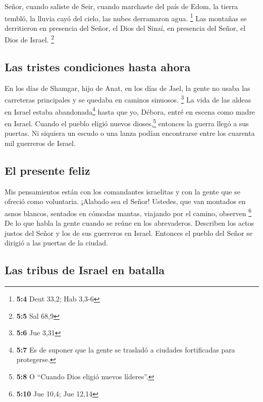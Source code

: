  Señor, cuando saliste de Seir, cuando marchaste del país
de Edom, la tierra tembló, la lluvia cayó del cielo, las nubes
derramaron agua. \footnote{\textbf{5:4} Deut 33,2; Hab 3,3-6}
 Las montañas se derritieron en presencia del Señor, el
Dios del Sinaí, en presencia del Señor, el Dios de Israel. \footnote{\textbf{5:5}
  Sal 68,9}

\hypertarget{las-tristes-condiciones-hasta-ahora}{%
\subsection{Las tristes condiciones hasta
ahora}\label{las-tristes-condiciones-hasta-ahora}}

 En los días de Shamgar, hijo de Anat, en los días de
Jael, la gente no usaba las carreteras principales y se quedaba en
caminos sinuosos. \footnote{\textbf{5:6} Jue 3,31}  La
vida de las aldeas en Israel estaba abandonada\footnote{\textbf{5:7} Es
  de suponer que la gente se trasladó a ciudades fortificadas para
  protegerse.} hasta que yo, Débora, entré en escena como madre en
Israel.  Cuando el pueblo eligió nuevos dioses,\footnote{\textbf{5:8}
  O ``Cuando Dios eligió nuevos líderes''.} entonces la guerra llegó a
sus puertas. Ni siquiera un escudo o una lanza podían encontrarse entre
los cuarenta mil guerreros de Israel.

\hypertarget{el-presente-feliz}{%
\subsection{El presente feliz}\label{el-presente-feliz}}

 Mis pensamientos están con los comandantes israelitas y
con la gente que se ofreció como voluntaria. ¡Alabado sea el Señor!
 Ustedes, que van montados en asnos blancos, sentados en
cómodas mantas, viajando por el camino, observen \footnote{\textbf{5:10}
  Jue 10,4; Jue 12,14}  De lo que habla la gente cuando
se reúne en los abrevaderos. Describen los actos justos del Señor y los
de sus guerreros en Israel. Entonces el pueblo del Señor se dirigió a
las puertas de la ciudad.

\hypertarget{las-tribus-de-israel-en-batalla}{%
\subsection{Las tribus de Israel en
batalla}\label{las-tribus-de-israel-en-batalla}}

